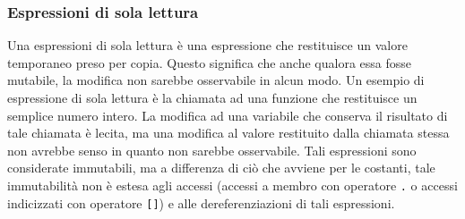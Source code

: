 \subsubsection{Espressioni di sola lettura}
Una espressioni di sola lettura è una espressione che restituisce un valore temporaneo preso per copia. Questo 
significa che anche qualora essa fosse mutabile, la modifica non sarebbe osservabile in alcun modo. Un esempio di 
espressione di sola lettura è la chiamata ad una funzione che restituisce un semplice numero intero. La modifica ad una variabile 
che conserva il risultato di tale chiamata è lecita, ma una modifica al valore restituito dalla chiamata stessa non avrebbe senso 
in quanto non sarebbe osservabile. Tali espressioni sono considerate immutabili, ma a differenza di ciò che avviene per le costanti,
tale immutabilità non è estesa agli accessi (accessi a membro con operatore \texttt{.} o accessi indicizzati con operatore \texttt{[]})
e alle dereferenziazioni di tali espressioni.
